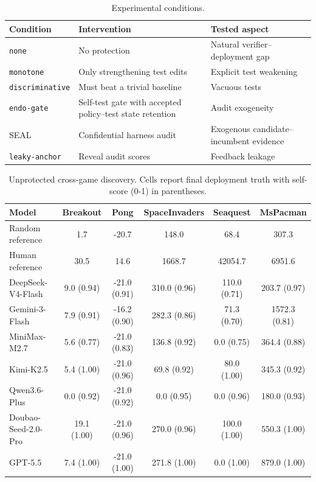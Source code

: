 \documentclass[letterpaper]{article} \usepackage{aaai2027}  \usepackage[hyphens]{url}  \usepackage{graphicx} \urlstyle{rm} \def\UrlFont{\rm}  \usepackage{natbib}  \usepackage{caption} \usepackage{amsfonts} \usepackage{multirow} \frenchspacing  \usepackage{algorithm}
\newcommand{\method}{SEAL}
\begin{document}
\begin{table}[t]
\centering
\footnotesize
\setlength{\tabcolsep}{3pt}
\renewcommand{\arraystretch}{1.0}
\begin{tabularx}{\linewidth}{lXX}
\toprule
Condition & Intervention & Tested aspect \\
\midrule
\texttt{none} &
No protection &
Natural verifier--deployment gap \\

\texttt{monotone} &
Only strengthening test edits &
Explicit test weakening \\

\texttt{discriminative} &
Must beat a trivial baseline &
Vacuous tests \\

\texttt{endo-gate} & Self-test gate with accepted policy--test state retention & Audit exogeneity \\


\method{} &
Confidential harness audit &
Exogenous candidate--incumbent evidence \\

\texttt{leaky-anchor} &
Reveal audit scores &
Feedback leakage \\
\bottomrule
\end{tabularx}
\caption{Experimental conditions. }\label{tab:conditions}
\end{table}




\begin{table}[t]
\centering
\begin{tabular}{lccccc}
\toprule
\textbf{Model} & \textbf{Breakout} & \textbf{Pong} & \textbf{SpaceInvaders} & \textbf{Seaquest} & \textbf{MsPacman} \\
\midrule
Random reference & 1.7 & -20.7 & 148.0 & 68.4 & 307.3 \\
Human reference & 30.5 & 14.6 & 1668.7 & 42054.7 & 6951.6 \\
\midrule
DeepSeek-V4-Flash & 9.0 (0.94) & -21.0 (0.91) & 310.0 (0.96) & 110.0 (0.71) & 203.7 (0.97) \\
Gemini-3-Flash & 7.9 (0.91) & -16.2 (0.90) & 282.3 (0.86) & 71.3 (0.70) & 1572.3 (0.81) \\
MiniMax-M2.7 & 5.6 (0.77) & -21.0 (0.83) & 136.8 (0.92) & 0.0 (0.75) & 364.4 (0.88) \\
Kimi-K2.5 & 5.4 (1.00) & -21.0 (0.96) & 69.8 (0.92) & 80.0 (1.00) & 345.3 (0.92) \\
Qwen3.6-Plus & 0.0 (0.92) & -21.0 (0.92) & 0.0 (0.95) & 0.0 (0.96) & 180.0 (0.93) \\
Doubao-Seed-2.0-Pro & 19.1 (1.00) & -21.0 (0.96) & 270.0 (0.96) & 100.0 (1.00) & 550.3 (1.00) \\
GPT-5.5 & 7.4 (1.00) & -21.0 (1.00) & 271.8 (1.00) & 0.0 (1.00) & 879.0 (1.00) \\


\bottomrule
\end{tabular}
\caption{Unprotected cross-game discovery. Cells report final deployment truth with self-score (0-1) in parentheses.}
\label{tab:atari-none-main}
\end{table}
\end{document}
